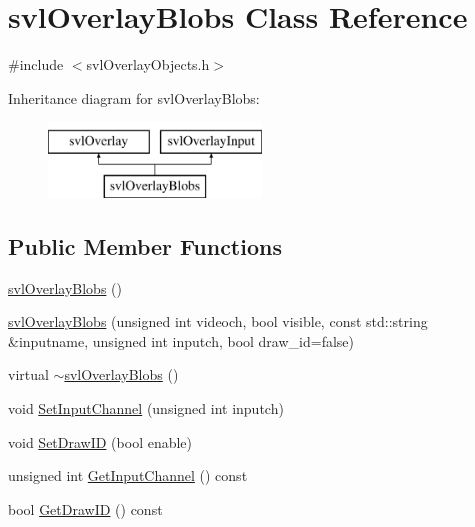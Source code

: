 \hypertarget{classsvl_overlay_blobs}{}\section{svl\+Overlay\+Blobs Class Reference}
\label{classsvl_overlay_blobs}


{\ttfamily \#include $<$svl\+Overlay\+Objects.\+h$>$}

Inheritance diagram for svl\+Overlay\+Blobs\+:\begin{figure}[H]
\begin{center}
\leavevmode
\includegraphics[height=2.000000cm]{d6/de4/classsvl_overlay_blobs}
\end{center}
\end{figure}
\subsection*{Public Member Functions}
\begin{DoxyCompactItemize}
\item 
\hyperlink{classsvl_overlay_blobs_a7ae5a22458d855e89f08250aa8a697db}{svl\+Overlay\+Blobs} ()
\item 
\hyperlink{classsvl_overlay_blobs_ad7e963f2a5f86beec96a36a231b1067e}{svl\+Overlay\+Blobs} (unsigned int videoch, bool visible, const std\+::string \&inputname, unsigned int inputch, bool draw\+\_\+id=false)
\item 
virtual \hyperlink{classsvl_overlay_blobs_aa34522da64f014a52b50b83cc62c020a}{$\sim$svl\+Overlay\+Blobs} ()
\item 
void \hyperlink{classsvl_overlay_blobs_a74cd4c4798433de8f7689c9dd2549b3d}{Set\+Input\+Channel} (unsigned int inputch)
\item 
void \hyperlink{classsvl_overlay_blobs_af0ff36a3e91c5543a98d09d9eb33a87e}{Set\+Draw\+I\+D} (bool enable)
\item 
unsigned int \hyperlink{classsvl_overlay_blobs_a4c2ef413956516fbdca1ac03a01d962e}{Get\+Input\+Channel} () const 
\item 
bool \hyperlink{classsvl_overlay_blobs_af111ea8022890e4a4141c42521b66296}{Get\+Draw\+I\+D} () const 
\end{DoxyCompactItemize}
